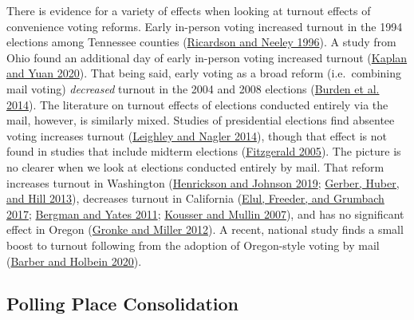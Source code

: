 \documentclass[
  12pt,
]{article}
\begin{document}
There is evidence for a variety of effects when looking at turnout effects of convenience voting reforms. Early in-person voting increased turnout in the 1994 elections among Tennessee counties (\protect\hyperlink{ref-Ricardson1996}{Ricardson and Neeley 1996}). A study from Ohio found an additional day of early in-person voting increased turnout (\protect\hyperlink{ref-Kaplan2020}{Kaplan and Yuan 2020}). That being said, early voting as a broad reform (i.e.~combining mail voting) \emph{decreased} turnout in the 2004 and 2008 elections (\protect\hyperlink{ref-Burden2014}{Burden et al. 2014}). The literature on turnout effects of elections conducted entirely via the mail, however, is similarly mixed. Studies of presidential elections find absentee voting increases turnout (\protect\hyperlink{ref-Leighley2014}{Leighley and Nagler 2014}), though that effect is not found in studies that include midterm elections (\protect\hyperlink{ref-Fitzgerald2005}{Fitzgerald 2005}). The picture is no clearer when we look at elections conducted entirely by mail. That reform increases turnout in Washington (\protect\hyperlink{ref-Henrickson2019}{Henrickson and Johnson 2019}; \protect\hyperlink{ref-Gerber2013}{Gerber, Huber, and Hill 2013}), decreases turnout in California (\protect\hyperlink{ref-Elul2017}{Elul, Freeder, and Grumbach 2017}; \protect\hyperlink{ref-Bergman2011}{Bergman and Yates 2011}; \protect\hyperlink{ref-Kousser2007}{Kousser and Mullin 2007}), and has no significant effect in Oregon (\protect\hyperlink{ref-Gronke2012}{Gronke and Miller 2012}). A recent, national study finds a small boost to turnout following from the adoption of Oregon-style voting by mail (\protect\hyperlink{ref-Barber2020}{Barber and Holbein 2020}).

\hypertarget{polling-place-consolidation}{%
\subsection*{Polling Place Consolidation}\label{polling-place-consolidation}}
\end{document}
